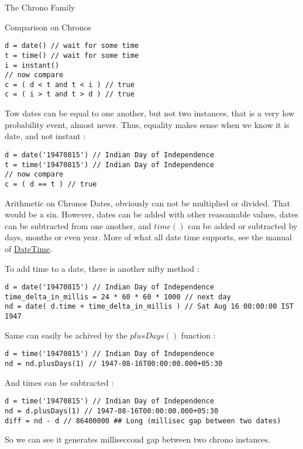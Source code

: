 \begin{section}{The Chrono Family}
\begin{subsection}{Comparison on Chronos}
\begin{lstlisting}[style=JexlStyle]
d = date() // wait for some time 
t = time() // wait for some time 
i = instant()
// now compare 
c = ( d < t and t < i ) // true 
c = ( i > t and t > d ) // true 
\end{lstlisting}

Tow dates can be equal to one another, but not two instances,
that is a very low probability event, almost never.
Thus, equality makes sense when we know it is date, and not instant :

\begin{lstlisting}[style=JexlStyle]
d = date('19470815') // Indian Day of Independence  
t = time('19470815') // Indian Day of Independence  
// now compare 
c = ( d == t ) // true 
\end{lstlisting}

\end{subsection}

\begin{subsection}{Arithmetic on Chronos}
Dates, obviously can not be multiplied or divided.
That would be a sin. However, dates can be added with other reasoanable values, 
dates can be subtracted from one another, and $time()$ can be added or subtracted by days, months or even year.
More of what all date time supports, 
see the manual of \href{http://joda-time.sourceforge.net/apidocs/org/joda/time/DateTime.html}{DateTime}.

To add time to a date, there is another nifty method :

\begin{lstlisting}[style=JexlStyle]
d = date('19470815') // Indian Day of Independence  
time_delta_in_millis = 24 * 60 * 60 * 1000 // next day 
nd = date( d.time + time_delta_in_millis ) // Sat Aug 16 00:00:00 IST 1947 
\end{lstlisting}

Same can easily be achived by the $plusDays()$ function :

\begin{lstlisting}[style=JexlStyle]
d = time('19470815') // Indian Day of Independence  
nd = nd.plusDays(1) // 1947-08-16T00:00:00.000+05:30 
\end{lstlisting}

And times can be subtracted :

\begin{lstlisting}[style=JexlStyle]
d = time('19470815') // Indian Day of Independence  
nd = d.plusDays(1) // 1947-08-16T00:00:00.000+05:30 
diff = nd - d // 86400000 ## Long (millisec gap between two dates)
\end{lstlisting}

So we can see it generates milliseccond gap between two chrono instances.

\end{subsection}

\end{section}

